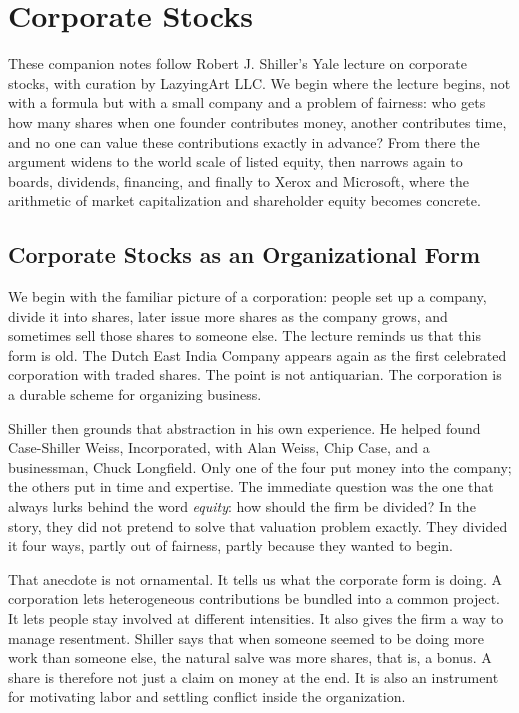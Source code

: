 \chapter{Corporate Stocks}

These companion notes follow Robert J. Shiller's Yale lecture on corporate stocks, with curation by LazyingArt LLC. We begin where the lecture begins, not with a formula but with a small company and a problem of fairness: who gets how many shares when one founder contributes money, another contributes time, and no one can value these contributions exactly in advance? From there the argument widens to the world scale of listed equity, then narrows again to boards, dividends, financing, and finally to Xerox and Microsoft, where the arithmetic of market capitalization and shareholder equity becomes concrete.

\section{Corporate Stocks as an Organizational Form}

We begin with the familiar picture of a corporation: people set up a company, divide it into shares, later issue more shares as the company grows, and sometimes sell those shares to someone else. The lecture reminds us that this form is old. The Dutch East India Company appears again as the first celebrated corporation with traded shares. The point is not antiquarian. The corporation is a durable scheme for organizing business.

Shiller then grounds that abstraction in his own experience. He helped found Case-Shiller Weiss, Incorporated, with Alan Weiss, Chip Case, and a businessman, Chuck Longfield. Only one of the four put money into the company; the others put in time and expertise. The immediate question was the one that always lurks behind the word \emph{equity}: how should the firm be divided? In the story, they did not pretend to solve that valuation problem exactly. They divided it four ways, partly out of fairness, partly because they wanted to begin.

That anecdote is not ornamental. It tells us what the corporate form is doing. A corporation lets heterogeneous contributions be bundled into a common project. It lets people stay involved at different intensities. It also gives the firm a way to manage resentment. Shiller says that when someone seemed to be doing more work than someone else, the natural salve was more shares, that is, a bonus. A share is therefore not just a claim on money at the end. It is also an instrument for motivating labor and settling conflict inside the organization.

